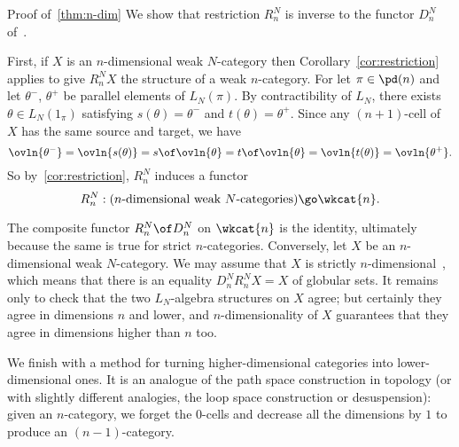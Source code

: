 \begin{prooflike}{Proof of~\ref{thm:n-dim}}
We show that restriction%
%
%
$R^N_n$ is inverse to the functor $D^N_n$
of~.  

First, if $X$ is an $n$-dimensional weak $N$-category then
Corollary~\ref{cor:restriction} applies to give $R^N_n X$ the structure of
a weak $n$-category.  For let $\pi\in\pd(n)$ and let $\theta^-$, $\theta^+$
be parallel elements of $L_N(\pi)$.  By contractibility of $L_N$, there
exists $\theta \in L_N(1_\pi)$ satisfying $s(\theta) = \theta^-$ and
$t(\theta) = \theta^+$.  Since any $(n+1)$-cell of $X$ has the same source
and target, we have
\[
\ovln{\theta^-} 
=
\ovln{s(\theta)}
=
s \of \ovln{\theta}
=
t \of \ovln{\theta}
=
\ovln{t(\theta)}
=
\ovln{\theta^+}.
\]
So by~\ref{cor:restriction}, $R^N_n$ induces a functor
\[
R^N_n:
(n \textup{-dimensional weak } N \textup{-categories})
\go
\wkcat{n}.
\]

The composite functor $R^N_n \of D^N_n$ on $\wkcat{n}$ is the identity,
ultimately because the same is true for strict $n$-categories.  Conversely,
let $X$ be an $n$-dimensional weak $N$-category.  We may assume that $X$ is
strictly $n$-dimensional~, which means that there
is an equality $D^N_n R^N_n X = X$ of globular sets.  It remains only to
check that the two $L_N$-algebra structures on $X$ agree; but certainly
they agree in dimensions $n$ and lower, and $n$-dimensionality
of $X$ guarantees that they agree in dimensions higher than $n$ too.
\done
\end{prooflike}

We finish with a method for turning higher-dimensional categories into
lower-dimensional ones.  It is an analogue of the path space construction
in topology (or with slightly different analogies, the loop space
construction or desuspension): given an $n$-category, we forget the
$0$-cells and decrease all the dimensions by $1$ to produce an
$(n-1)$-category.

